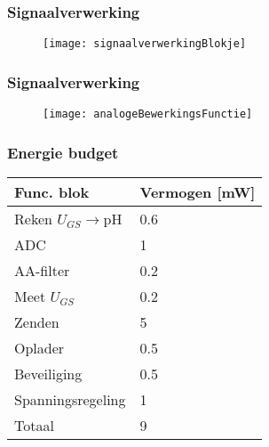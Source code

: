\begin{frame}
    \frametitle{Signaalverwerking}
    
    \begin{figure}
        \centering
        \texttt{[image: signaalverwerkingBlokje]}
    \end{figure}

\end{frame}

\begin{frame}
    \frametitle{Signaalverwerking}
    
    \begin{figure}
        \centering
        \texttt{[image: analogeBewerkingsFunctie]}
    \end{figure}

\end{frame}

\begin{frame}
    \frametitle{Energie budget}
    \begin{table}[ht]
        \centering
        \begin{tabular}{l|l}
            Func. blok          & Vermogen [mW] \\
            \hline                              
            Reken $U_{GS}\rightarrow$pH & 0.6   \\
            ADC                 & 1             \\
            AA-filter           & 0.2           \\
            Meet $U_{GS}$       & 0.2           \\
            Zenden              & 5             \\
            Oplader             & 0.5           \\
            Beveiliging         & 0.5           \\
            Spanningsregeling   & 1             \\ 
            \hline
            \hline
            Totaal              & 9
            
        \end{tabular}
        \label{tab:energieBudgetEstimatie}
    \end{table}
    
\end{frame}